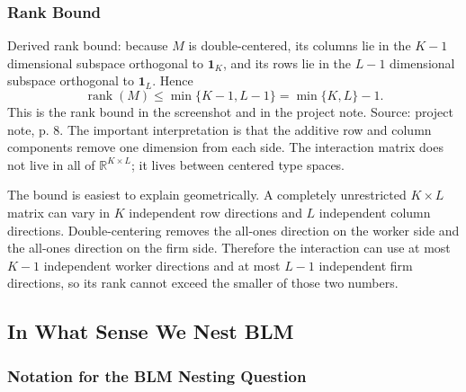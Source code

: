 ﻿\documentclass[11pt]{article}
\newcommand{\1}{\mathbf{1}}
\begin{document}
\subsubsection{Rank Bound}

Derived rank bound: because $M$ is double-centered, its columns lie in the $K-1$ dimensional
subspace orthogonal to $\1_K$, and its rows lie in the $L-1$ dimensional
subspace orthogonal to $\1_L$. Hence
\[
\operatorname{rank}(M)
\leq
\min\{K-1,L-1\}
=
\min\{K,L\}-1.
\]
This is the rank bound in the screenshot and in the project note. Source:
project note, p. 8. The important interpretation is that the additive row and
column components remove one dimension from each side. The interaction matrix
does not live in all of $\mathbb R^{K\times L}$; it lives between centered type
spaces.

The bound is easiest to explain geometrically. A completely unrestricted
$K\times L$ matrix can vary in $K$ independent row directions and $L$ independent
column directions. Double-centering removes the all-ones direction on the worker
side and the all-ones direction on the firm side. Therefore the interaction can
use at most $K-1$ independent worker directions and at most $L-1$ independent firm
directions, so its rank cannot exceed the smaller of those two numbers.

\subsection{In What Sense We Nest BLM}

\subsubsection{Notation for the BLM Nesting Question}
\end{document}

